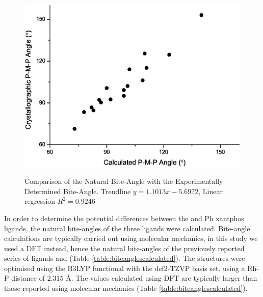 {\begin{figure}[htb]
\begin{center}
\vspace{0.5cm}
\includegraphics[width=\textwidth]{../Figures/Biteanglegraphorigin.eps}
\caption[Comparison of the Natural Bite-Angle with the Experimentally Determined Bite-Angle]{Comparison of the Natural Bite-Angle with the Experimentally Determined Bite-Angle.  Trendline $ y = 1.1013x - 5.6972$, Linear regression $R^2 = 0.9246$}
\vspace{0.2cm}
\label{Biteanglegraph}
\end{center}
\end{figure}
\vspace{0.2cm}

In order to determine the potential differences between the \tBu{} and Ph xantphos ligands, the natural bite-angles of the three \tBuxantphos{} ligands were calculated.  Bite-angle calculations are typically carried out using molecular mechanics, in this study we used a \gls{DFT} instead, hence the natural bite-angles of the previously reported \Phxantphos{} series of ligands and \tBuxantphos{} (Table \ref{table:biteanglescalculated}).  The structures were optimised using the B3LYP functional\cite{Becke1993, Lee1988, Vosko1980, Stephens1994} with the def2-TZVP basis set.\cite{Andrae1990, Weigend2005} using a Rh-P distance of 2.315 \si{\angstrom}.  The values calculated using \gls{DFT} are typically larger than those reported using molecular mechanics (Table \ref{table:biteanglescalculated}).


}
